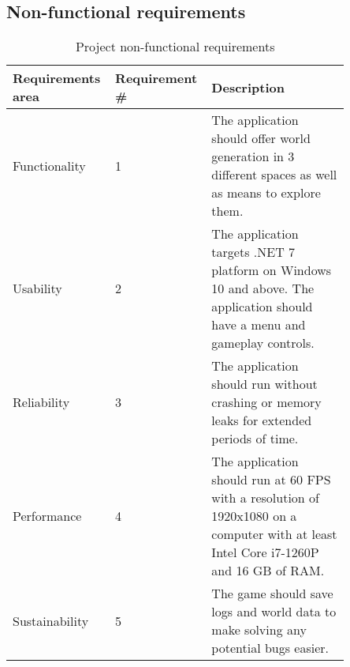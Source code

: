 \subsection{Non-functional requirements}

\begin{table}[H]
    \begin{tabular}{|p{0.25\linewidth}|p{0.2\linewidth}|p{0.4\linewidth}|}
        \hline
        \textbf{Requirements area} & \textbf{Requirement \#} & \textbf{Description}                                                                                                                  \\ \hline
        Functionality              & 1                       & The application should offer world generation in 3 different spaces as well as means to explore them.                                 \\ \hline
        Usability                  & 2                       & The application targets .NET 7 platform on Windows 10 and above. The application should have a menu and gameplay controls.            \\ \hline
        Reliability                & 3                       & The application should run without crashing or memory leaks for extended periods of time.                                             \\ \hline
        Performance                & 4                       & The application should run at 60 FPS with a resolution of 1920x1080 on a computer with at least Intel Core i7-1260P and 16 GB of RAM. \\ \hline
        Sustainability             & 5                       & The game should save logs and world data to make solving any potential bugs easier.                                                   \\ \hline
    \end{tabular}
    \caption{Project non-functional requirements}
\end{table}
